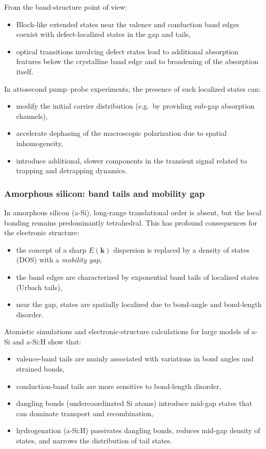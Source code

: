 From the band-structure point of view:
\begin{itemize}
  \item Bloch-like extended states near the valence and conduction band edges coexist with defect-localized states in the gap and tails,
  \item optical transitions involving defect states lead to additional absorption features below the crystalline band edge and to broadening of the absorption itself.
\end{itemize}
In attosecond pump--probe experiments, the presence of such localized states can:
\begin{itemize}
  \item modify the initial carrier distribution (e.g.\ by providing sub-gap absorption channels),
  \item accelerate dephasing of the macroscopic polarization due to spatial inhomogeneity,
  \item introduce additional, slower components in the transient signal related to trapping and detrapping dynamics.
\end{itemize}

\subsubsection{Amorphous silicon: band tails and mobility gap}

In amorphous silicon (a-Si), long-range translational order is absent, but the local bonding remains predominantly tetrahedral. 
This has profound consequences for the electronic structure:\cite{Robertson1983,Drabold1999}
\begin{itemize}
  \item the concept of a sharp $E(\mathbf k)$ dispersion is replaced by a density of states (DOS) with a \emph{mobility gap},
  \item the band edges are characterized by exponential band tails of localized states (Urbach tails),
  \item near the gap, states are spatially localized due to bond-angle and bond-length disorder.
\end{itemize}

Atomistic simulations and electronic-structure calculations for large models of a-Si and a-Si:H show that:\cite{Allan1998,DongDrabold1997,AttaFynn2004,Meidanshahi2019,Luo2024}
\begin{itemize}
  \item valence-band tails are mainly associated with variations in bond angles and strained bonds,
  \item conduction-band tails are more sensitive to bond-length disorder,
  \item dangling bonds (undercoordinated Si atoms) introduce mid-gap states that can dominate transport and recombination,
  \item hydrogenation (a-Si:H) passivates dangling bonds, reduces mid-gap density of states, and narrows the distribution of tail states.
\end{itemize}


